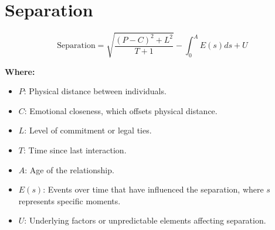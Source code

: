 \chapter{Separation}

\begin{equation}
\text{Separation} = \sqrt{\frac{(P - C)^2 + L^2}{T + 1}} - \int_{0}^{A} E(s) ds + U
\end{equation}

\textbf{Where:}

\begin{itemize}
    \item $P$: Physical distance between individuals.
    \item $C$: Emotional closeness, which offsets physical distance.
    \item $L$: Level of commitment or legal ties.
    \item $T$: Time since last interaction.
    \item $A$: Age of the relationship.
    \item $E(s)$: Events over time that have influenced the separation, where $s$ represents specific moments.
    \item $U$: Underlying factors or unpredictable elements affecting separation.
\end{itemize}